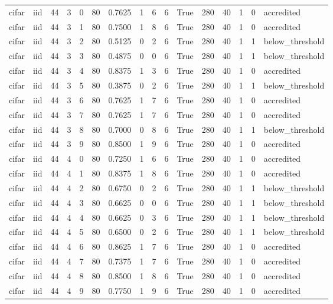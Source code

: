 \begin{tabular}{llrrrrrrrrrrrrrl}
cifar & iid & 44 & 3 & 0 & 80 & 0.7625 & 1 & 6 & 6 & True & 280 & 40 & 1 & 0 & accredited \\
cifar & iid & 44 & 3 & 1 & 80 & 0.7500 & 1 & 8 & 6 & True & 280 & 40 & 1 & 0 & accredited \\
cifar & iid & 44 & 3 & 2 & 80 & 0.5125 & 0 & 2 & 6 & True & 280 & 40 & 1 & 1 & below\_threshold \\
cifar & iid & 44 & 3 & 3 & 80 & 0.4875 & 0 & 0 & 6 & True & 280 & 40 & 1 & 1 & below\_threshold \\
cifar & iid & 44 & 3 & 4 & 80 & 0.8375 & 1 & 3 & 6 & True & 280 & 40 & 1 & 0 & accredited \\
cifar & iid & 44 & 3 & 5 & 80 & 0.3875 & 0 & 2 & 6 & True & 280 & 40 & 1 & 1 & below\_threshold \\
cifar & iid & 44 & 3 & 6 & 80 & 0.7625 & 1 & 7 & 6 & True & 280 & 40 & 1 & 0 & accredited \\
cifar & iid & 44 & 3 & 7 & 80 & 0.7625 & 1 & 7 & 6 & True & 280 & 40 & 1 & 0 & accredited \\
cifar & iid & 44 & 3 & 8 & 80 & 0.7000 & 0 & 8 & 6 & True & 280 & 40 & 1 & 1 & below\_threshold \\
cifar & iid & 44 & 3 & 9 & 80 & 0.8500 & 1 & 9 & 6 & True & 280 & 40 & 1 & 0 & accredited \\
cifar & iid & 44 & 4 & 0 & 80 & 0.7250 & 1 & 6 & 6 & True & 280 & 40 & 1 & 0 & accredited \\
cifar & iid & 44 & 4 & 1 & 80 & 0.8375 & 1 & 8 & 6 & True & 280 & 40 & 1 & 0 & accredited \\
cifar & iid & 44 & 4 & 2 & 80 & 0.6750 & 0 & 2 & 6 & True & 280 & 40 & 1 & 1 & below\_threshold \\
cifar & iid & 44 & 4 & 3 & 80 & 0.6625 & 0 & 0 & 6 & True & 280 & 40 & 1 & 1 & below\_threshold \\
cifar & iid & 44 & 4 & 4 & 80 & 0.6625 & 0 & 3 & 6 & True & 280 & 40 & 1 & 1 & below\_threshold \\
cifar & iid & 44 & 4 & 5 & 80 & 0.6500 & 0 & 2 & 6 & True & 280 & 40 & 1 & 1 & below\_threshold \\
cifar & iid & 44 & 4 & 6 & 80 & 0.8625 & 1 & 7 & 6 & True & 280 & 40 & 1 & 0 & accredited \\
cifar & iid & 44 & 4 & 7 & 80 & 0.7375 & 1 & 7 & 6 & True & 280 & 40 & 1 & 0 & accredited \\
cifar & iid & 44 & 4 & 8 & 80 & 0.8500 & 1 & 8 & 6 & True & 280 & 40 & 1 & 0 & accredited \\
cifar & iid & 44 & 4 & 9 & 80 & 0.7750 & 1 & 9 & 6 & True & 280 & 40 & 1 & 0 & accredited \\

\end{tabular}
